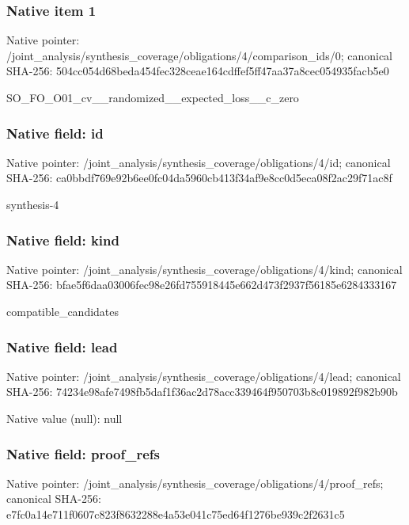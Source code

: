 \documentclass[10pt,a4paper]{article}
\begin{document}
\subsubsection{Native item 1}
Native pointer: /joint\_\allowbreak{}analysis/synthesis\_\allowbreak{}coverage/obligations/4/comparison\_\allowbreak{}ids/0; canonical SHA-256: 504cc054d68beda454fec328ceae164cdffef5ff47aa37a8cec054935facb5e0

\begingroup\raggedright\sloppy SO\_\allowbreak{}FO\_\allowbreak{}O01\_\allowbreak{}cv\_\allowbreak{}\_\allowbreak{}randomized\_\allowbreak{}\_\allowbreak{}expected\_\allowbreak{}loss\_\allowbreak{}\_\allowbreak{}c\_\allowbreak{}zero\par\endgroup

\subsubsection{Native field: id}
Native pointer: /joint\_\allowbreak{}analysis/synthesis\_\allowbreak{}coverage/obligations/4/id; canonical SHA-256: ca0bbdf769e92b6ee0fc04da5960cb413f34af9e8cc0d5eca08f2ac29f71ac8f

\begingroup\raggedright\sloppy synthesis-4\par\endgroup

\subsubsection{Native field: kind}
Native pointer: /joint\_\allowbreak{}analysis/synthesis\_\allowbreak{}coverage/obligations/4/kind; canonical SHA-256: bfae5f6daa03006fec98e26fd755918445e662d473f2937f56185e6284333167

\begingroup\raggedright\sloppy compatible\_\allowbreak{}candidates\par\endgroup

\subsubsection{Native field: lead}
Native pointer: /joint\_\allowbreak{}analysis/synthesis\_\allowbreak{}coverage/obligations/4/lead; canonical SHA-256: 74234e98afe7498fb5daf1f36ac2d78acc339464f950703b8c019892f982b90b

Native value (null): null

\subsubsection{Native field: proof\_\allowbreak{}refs}
Native pointer: /joint\_\allowbreak{}analysis/synthesis\_\allowbreak{}coverage/obligations/4/proof\_\allowbreak{}refs; canonical SHA-256: e7fc0a14e711f0607c823f8632288e4a53e041c75ed64f1276be939c2f2631c5
\end{document}
